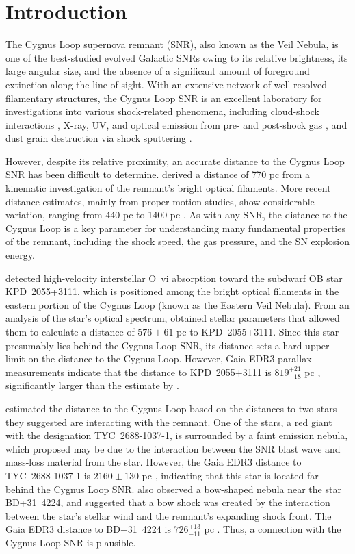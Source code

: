 \documentclass[fleqn,usenatbib]{mnras}
\begin{document}
\section{Introduction}
The Cygnus Loop supernova remnant (SNR), also known as the Veil Nebula, is one of the best-studied evolved Galactic SNRs owing to its relative brightness, its large angular size, and the absence of a significant amount of foreground extinction along the line of sight. With an extensive network of well-resolved filamentary structures, the Cygnus Loop SNR is an excellent laboratory for investigations into various shock-related phenomena, including cloud-shock interactions \citep[e.g.,][]{d01,p02}, X-ray, UV, and optical emission from pre- and post-shock gas \citep[e.g.,][]{s00,b02,s09,m14,ray23}, and dust grain destruction via shock sputtering \citep[e.g.,][]{s10,r13}.

However, despite its relative proximity, an accurate distance to the Cygnus Loop SNR has been difficult to determine. \citet{m58} derived a distance of 770 pc from a kinematic investigation of the remnant's bright optical filaments. More recent distance estimates, mainly from proper motion studies, show considerable variation, ranging from 440 pc to 1400 pc \citep[see the summary of results provided by][]{f18a}. As with any SNR, the distance to the Cygnus Loop is a key parameter for understanding many fundamental properties of the remnant, including the shock speed, the gas pressure, and the SN explosion energy.

\citet{b09} detected high-velocity interstellar O~{\sc vi} absorption toward the subdwarf OB star KPD~2055+3111, which is positioned among the bright optical filaments in the eastern portion of the Cygnus Loop (known as the Eastern Veil Nebula). From an analysis of the star's optical spectrum, \citet{b09} obtained stellar parameters that allowed them to calculate a distance of $576\pm61$ pc to KPD~2055+3111. Since this star presumably lies behind the Cygnus Loop SNR, its distance sets a hard upper limit on the distance to the Cygnus Loop. However, Gaia EDR3 parallax measurements indicate that the distance to KPD~2055+3111 is $819^{+21}_{-18}$ pc \citep{bj21}, significantly larger than the estimate by \citet{b09}.

\citet{f18a} estimated the distance to the Cygnus Loop based on the distances to two stars they suggested are interacting with the remnant. One of the stars, a red giant with the designation TYC~2688-1037-1, is surrounded by a faint emission nebula, which \citet{f18a} proposed may be due to the interaction between the SNR blast wave and mass-loss material from the star. However, the Gaia EDR3 distance to TYC~2688-1037-1 is $2160\pm130$ pc \citep{bj21}, indicating that this star is located far behind the Cygnus Loop SNR. \citet{f18a} also observed a bow-shaped nebula near the star BD+31~4224, and suggested that a bow shock was created by the interaction between the star's stellar wind and the remnant's expanding shock front. The Gaia EDR3 distance to BD+31~4224 is $726^{+13}_{-11}$ pc \citep{bj21}. Thus, a connection with the Cygnus Loop SNR is plausible.
\end{document}
